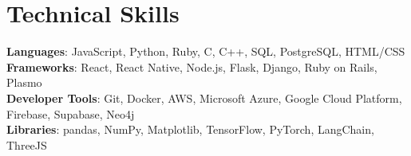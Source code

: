 \documentclass[letterpaper,11pt]{article}
\begin{document}
\section{Technical Skills}
 \begin{itemize}[leftmargin=0.15in, label={}]
    \small{\item{
     \textbf{Languages}{: JavaScript, Python, Ruby, C, C++, SQL, PostgreSQL, HTML/CSS} \\
     \textbf{Frameworks}{: React, React Native, Node.js, Flask, Django, Ruby on Rails, Plasmo} \\
     \textbf{Developer Tools}{: Git, Docker, AWS, Microsoft Azure, Google Cloud Platform, Firebase, Supabase, Neo4j} \\
     \textbf{Libraries}{: pandas, NumPy, Matplotlib, TensorFlow, PyTorch, LangChain, ThreeJS}
    }}
 \end{itemize}


\end{document}
